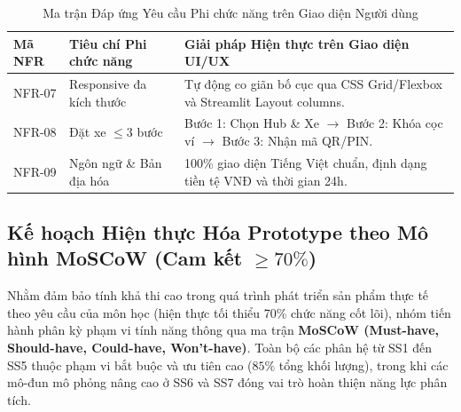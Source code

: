 \documentclass[12pt,a4paper]{article}
\begin{document}
\begin{table}[H]
    \centering
    \renewcommand{\arraystretch}{1.25}
    \caption{Ma trận Đáp ứng Yêu cầu Phi chức năng trên Giao diện Người dùng}
    \label{tab:ui-nfr-matrix}
    \begin{tabularx}{\textwidth}{|l|l|X|}
        \hline
        \textbf{Mã NFR} & \textbf{Tiêu chí Phi chức năng} & \textbf{Giải pháp Hiện thực trên Giao diện UI/UX} \\
        \hline
        NFR-07 & Responsive đa kích thước & Tự động co giãn bố cục qua CSS Grid/Flexbox và Streamlit Layout columns. \\
        \hline
        NFR-08 & Đặt xe $\le 3$ bước & Bước 1: Chọn Hub \& Xe $\rightarrow$ Bước 2: Khóa cọc ví $\rightarrow$ Bước 3: Nhận mã QR/PIN. \\
        \hline
        NFR-09 & Ngôn ngữ \& Bản địa hóa & 100\% giao diện Tiếng Việt chuẩn, định dạng tiền tệ VNĐ và thời gian 24h. \\
        \hline
    \end{tabularx}
\end{table}

\subsection{Kế hoạch Hiện thực Hóa Prototype theo Mô hình MoSCoW (Cam kết $\ge 70\%$)}
Nhằm đảm bảo tính khả thi cao trong quá trình phát triển sản phẩm thực tế theo yêu cầu của môn học (hiện thực tối thiểu 70\% chức năng cốt lõi), nhóm tiến hành phân kỳ phạm vi tính năng thông qua ma trận \textbf{MoSCoW (Must-have, Should-have, Could-have, Won't-have)}. Toàn bộ các phân hệ từ SS1 đến SS5 thuộc phạm vi bắt buộc và ưu tiên cao ($85\%$ tổng khối lượng), trong khi các mô-đun mô phỏng nâng cao ở SS6 và SS7 đóng vai trò hoàn thiện năng lực phân tích.
\end{document}
